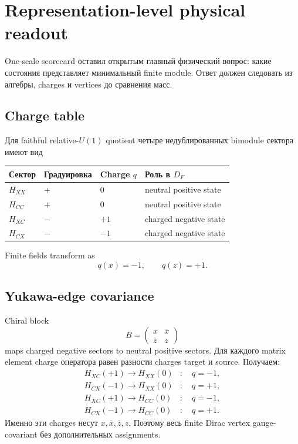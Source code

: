 \chapter{Representation-level physical readout}

One-scale scorecard оставил открытым главный физический вопрос: какие
состояния представляет минимальный finite module. Ответ должен следовать
из алгебры, charges и vertices до сравнения масс.

\section{Charge table}

Для faithful relative-\(U(1)\) quotient четыре недублированных bimodule
сектора имеют вид
\begin{center}
\begin{tabular}{llll}
\toprule
Сектор & Градуировка & Charge \(q\) & Роль в \(D_F\) \\
\midrule
\(H_{XX}\) & \(+\) & \(0\) & neutral positive state \\
\(H_{CC}\) & \(+\) & \(0\) & neutral positive state \\
\(H_{XC}\) & \(-\) & \(+1\) & charged negative state \\
\(H_{CX}\) & \(-\) & \(-1\) & charged negative state \\
\bottomrule
\end{tabular}
\end{center}
Finite fields transform as
\begin{equation}
 q(x)=-1,
 \qquad
 q(z)=+1.
\end{equation}

\section{Yukawa-edge covariance}

Chiral block
\begin{equation}
 B=
 \begin{pmatrix}
 x&\overline x\\
 \overline z&z
 \end{pmatrix}
\end{equation}
maps charged negative sectors to neutral positive sectors. Для каждого
matrix element charge оператора равен разности charges target и source.
Получаем:
\begin{align}
 H_{XC}(+1)\to H_{XX}(0)
 &:\quad q=-1,
 \\
 H_{CX}(-1)\to H_{XX}(0)
 &:\quad q=+1,
 \\
 H_{XC}(+1)\to H_{CC}(0)
 &:\quad q=-1,
 \\
 H_{CX}(-1)\to H_{CC}(0)
 &:\quad q=+1.
\end{align}
Именно эти charges несут \(x,\overline x,\overline z,z\). Поэтому весь
finite Dirac vertex gauge-covariant без дополнительных assignments.

